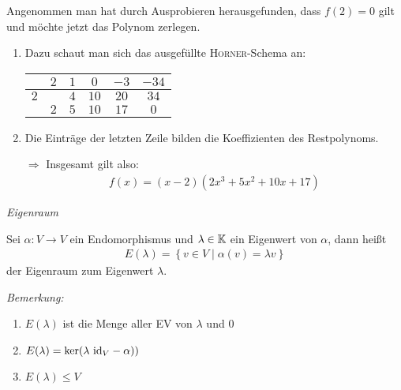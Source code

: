 \begin{itemize}
        Angenommen man hat durch Ausprobieren herausgefunden, dass $f(2)=0$ gilt und möchte jetzt das Polynom zerlegen.
        \begin{enumerate}
            \item Dazu schaut man sich das ausgefüllte \textsc{Horner}-Schema an:
                \begin{center}
                    \begin{tabular}{c|ccccc}
                        & $2$   & $1$   & $0$   & $-3$  & $-34$ \\\hline
                        $2$     &       & $4 $  & $10$  & $20$  & $34$   \\\hline
                        & $2$   & $5$   & $10$  & $17$  & $0$
                    \end{tabular}
                \end{center}
            \item Die Einträge der letzten Zeile bilden die Koeffizienten des Restpolynoms.
            \item[$\Rightarrow$] Insgesamt gilt also:
                \begin{align*}
                    f(x) = (x-2)(2x^3+5x^2+10x+17)
                \end{align*}
        \end{enumerate}
\end{itemize}


\begin{mydef}\label{eigenraum}\textit{Eigenraum}\medskip

    Sei $\alpha:V\to V$ ein Endomorphismus und $\lambda \in \mathbb{K}$ ein Eigenwert von $\alpha$, dann heißt
    \begin{align*}
        E(\lambda) = \left\{ v\in V \mid \alpha(v)=\lambda v \right\}
    \end{align*}
    der Eigenraum zum Eigenwert $\lambda$.
\end{mydef}

\textit{Bemerkung:}
\begin{enumerate}
    \item $E(\lambda)$ ist die Menge aller EV von $\lambda$ und $0$
    \item $E(\lambda) = \ker(\lambda\mbox{ id}_V-\alpha) )$
    \item $E(\lambda)\leq V$
\end{enumerate}

